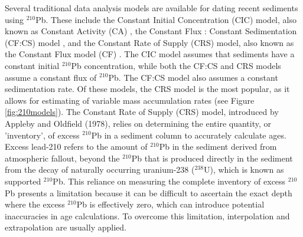 \documentclass [10pt] {article}
\begin{document}


Several traditional data analysis models are available for dating recent sediments using $^{210}$Pb. These include the Constant Initial Concentration (CIC) model, also known as Constant Activity (CA) \citep{Goldberg1963, Robbins1975}, the Constant Flux : Constant Sedimentation (CF:CS) model \citep{Crozaz1964}, and the Constant Rate of Supply (CRS) model, also known as the Constant Flux model (CF) \citep{Appleby1978, Robbins1978, Sanchez-Cabeza2012}. The CIC model assumes that sediments have a constant initial $^{210}$Pb concentration, while both the CF:CS and CRS models assume a constant flux of $^{210}$Pb. The CF:CS model also assumes a constant sedimentation rate. Of these models, the CRS model is the most popular, as it allows for estimating of variable mass accumulation rates (see Figure \ref{fig:210models}). 
The Constant Rate of Supply (CRS) model, introduced by Appleby and Oldfield (1978), relies on determining the entire quantity, or 'inventory', of excess $^{210}$Pb in a sediment column to accurately calculate ages. Excess lead-210 refers to the amount of $^{210}$Pb in the sediment derived from atmospheric fallout, beyond the $^{210}$Pb that is produced directly in the sediment from the decay of naturally occurring uranium-238 ($^{238}$U), which is known as supported $^{210}$Pb. This reliance on measuring the complete inventory of excess $^{210}$Pb presents a limitation because it can be difficult to ascertain the exact depth where the excess $^{210}$Pb is effectively zero, which can introduce potential inaccuracies in age calculations. To overcome this limitation, interpolation and extrapolation are usually applied. 
\end{document}
